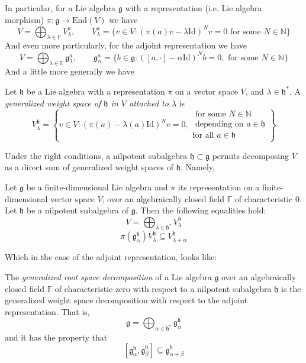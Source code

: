 In particular, for a Lie algebra $\mathfrak{g}$ with a
representation 
(i.e. Lie algebra morphism)
$\pi:\mathfrak{g} \to \text{End}(V)$ we have
$$
V=\bigoplus_{\lambda \in \mathbb{F}}V^a_\lambda,\qquad 
V^a_\lambda=\{v \in V:(\pi(a)v-\lambda \text{Id})^Nv=0\text{ for some }
N \in \mathbb{N}\}
$$
And even more particularly, for the adjoint representation we have
$$
V=\bigoplus_{\lambda \in \mathbb{F}}\mathfrak{g}^a_\lambda,\qquad 
\mathfrak{g}_\alpha^a=\{b \in \mathfrak{g}:([a,\cdot]-\alpha \text{Id})^Nb=0,
\text{ for some }N \in \mathbb{N}\}
$$
And a little more generally we have
\begin{definition}
\label{definition-generalized-weight-space}
Let $\mathfrak{h}$ be a Lie algebra with a representation $\pi$ on a vector
space $V$, and $\lambda \in \mathfrak{h}^*$.
A {\it generalized weight space of $\mathfrak{h}$ in $V$ attached to $\lambda$} 
is
$$
V_\lambda^\mathfrak{h}=
\left\{v \in V: (\pi(a)-\lambda(a)\text{Id})^Nv=0,
\substack{ \text{ for some }N \in \mathbb{N}\\
\text{ depending on }a \in \mathfrak{h}\\
\text{for all }a \in \mathfrak{h}}\right\}
$$
\end{definition}

Under the right conditions, a nilpotent subalgebra 
$\mathfrak{h} \subset \mathfrak{g}$ permits
decomposing $V$ as a direct sum of generalized weight
spaces of $\mathfrak{h}$. Namely,

\begin{theorem}
\label{theorem-decomposition-into-generalized-weight-spaces}
Let $\mathfrak{g}$ be a finite-dimensional Lie algebra
and $\pi$ its representation on a finite-dimensional vector
space $V$, over an algebraically closed field
$\mathbb{F}$ of characteristic 0.
Let $\mathfrak{h}$ be a nilpotent subalgebra of $\mathfrak{g}$.
Then the following equalities hold:
$$
V=\bigoplus_{\lambda \in \mathfrak{h}^*}V_\lambda^\mathfrak{h}
$$
\begin{equation}
\label{equation-inclusion-for-general-representation}
\pi\left(\mathfrak{g}^\mathfrak{h}_\alpha\right)V_\lambda^\mathfrak{h}
\subseteq V_{\lambda+\alpha}^\mathfrak{h}
\end{equation}
\end{theorem}

Which in the case of the adjoint representation, looks like:

\begin{definition}
\label{definition-generalized-root-space-decomposition}
The {\it generalized root space decomposition} of a Lie algebra 
$\mathfrak{g}$ over an algebraically closed field $\mathbb{F}$ 
of characteristic zero with respect to a nilpotent subalgebra $\mathfrak{h}$
is the generalized weight space decomposition with respect to the
adjoint representation. That is,
$$
\mathfrak{g}=\bigoplus_{\alpha \in \mathfrak{h}^*}
\mathfrak{g}_\alpha^\mathfrak{h}
$$
and it has the property that
\begin{equation}
\label{equation-inclusion-for-adjoint-representation}
[\mathfrak{g}_\alpha^\mathfrak{h},\mathfrak{g}_\beta^\mathfrak{h}]
\subseteq\mathfrak{g}_{\alpha+\beta}^\mathfrak{h}
\end{equation}
\end{definition}

